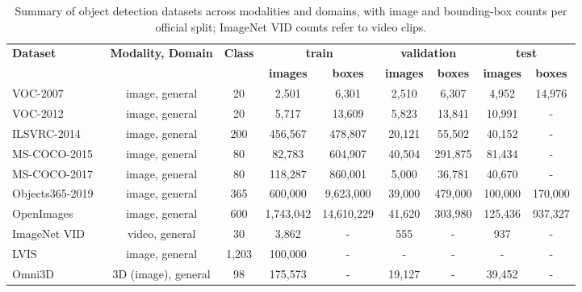 \begin{table}[!t]
\centering
\caption{Summary of object detection datasets across modalities and domains, with image and bounding-box counts per official split; ImageNet VID counts refer to video clips.}
\label{tab:object_detection_dataset}
\fontsize{9}{11}\selectfont
\setlength{\tabcolsep}{1.5mm}
\begin{tabular}{l cc cc cc cc }
\toprule
\multirow{2}{*}{\textbf{Dataset}}   & \multirow{2}{*}{\textbf{Modality, Domain}}   & \multirow{2}{*}{\textbf{Class}}   & \multicolumn{2}{c}{\textbf{train}} & \multicolumn{2}{c}{\textbf{validation}} & \multicolumn{2}{c}{\textbf{test}}  \\
\cmidrule(r){4-5}\cmidrule(r){6-7}\cmidrule(r){8-9}
  & & & \textbf{images} & \textbf{boxes} & \textbf{images} & \textbf{boxes} & \textbf{images} & \textbf{boxes} \\
\midrule
VOC-2007~\cite{pascal-voc-2007} & image, general & 20 & 2,501 & 6,301 & 2,510 & 6,307 & 4,952 & 14,976\\
VOC-2012~\cite{pascal-voc-2012} & image, general & 20 & 5,717 & 13,609 & 5,823 & 13,841 & 10,991 & - \\
ILSVRC-2014~\cite{ImageNet} & image, general & 200 & 456,567 & 478,807 & 20,121 & 55,502 & 40,152 & -\\
MS-COCO-2015~\cite{lin2014microsoft} & image, general & 80 & 82,783 & 604,907 & 40,504 & 291,875 & 81,434 & - \\
MS-COCO-2017~\cite{lin2014microsoft} & image, general & 80 & 118,287 & 860,001 & 5,000 & 36,781 & 40,670 & - \\
Objects365-2019~\cite{shao2019objects365} & image, general & 365 & 600,000 & 9,623,000 & 39,000 & 479,000 & 100,000 & 170,000\\
OpenImages~\cite{kuznetsova2020open} & image, general & 600 & 1,743,042 & 14,610,229 & 41,620 & 303,980 & 125,436 & 937,327 \\
ImageNet VID~\cite{ImageNet} & video, general & 30 & 3,862 & - & 555 & - & 937 & -\\
LVIS~\cite{gupta2019lvis} & image, general & 1,203 & 100,000 & - & - & - & - & - \\
Omni3D~\cite{Omni3D-Brazil0SR0G23} & 3D (image), general  & 98 & 175,573 & - & 19,127 & - & 39,452 & -  \\
\bottomrule
\end{tabular}
\end{table}

